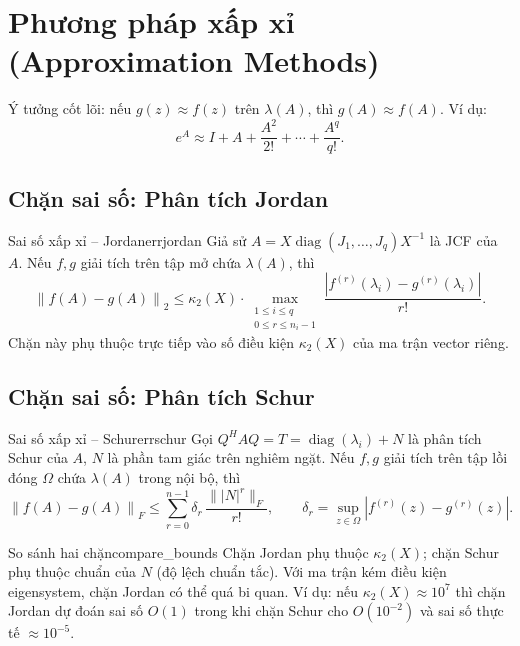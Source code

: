 \documentclass[12pt,a4paper]{report}
\newcommand{\norm}[1]{\left\lVert #1 \right\rVert}
\newcommand{\abs}[1]{\left\lvert #1 \right\rvert}
\newcommand{\diag}{\operatorname{diag}}
\begin{document}
\section{Phương pháp xấp xỉ (Approximation Methods)}
\label{sec:approx}

Ý tưởng cốt lõi: nếu $g(z) \approx f(z)$ trên $\lambda(A)$, thì $g(A) \approx f(A)$.
Ví dụ:
\[
  e^A \approx I + A + \frac{A^2}{2!} + \cdots + \frac{A^q}{q!}.
\]

\subsection{Chặn sai số: Phân tích Jordan}

\begin{theorem}{Sai số xấp xỉ -- Jordan}{errjordan}
Giả sử $A = X \diag(J_1,\ldots,J_q) X^{-1}$ là JCF của $A$. Nếu $f,g$ giải tích
trên tập mở chứa $\lambda(A)$, thì
\[
  \norm{f(A) - g(A)}_2
  \le \kappa_2(X) \cdot \max_{\substack{1 \le i \le q \\ 0 \le r \le n_i-1}}
      \frac{\abs{f^{(r)}(\lambda_i) - g^{(r)}(\lambda_i)}}{r!}.
\]
Chặn này phụ thuộc trực tiếp vào số điều kiện $\kappa_2(X)$ của ma trận vector riêng.
\end{theorem}

\subsection{Chặn sai số: Phân tích Schur}

\begin{theorem}{Sai số xấp xỉ -- Schur}{errschur}
Gọi $Q^H AQ = T = \diag(\lambda_i) + N$ là phân tích Schur của $A$, $N$ là phần
tam giác trên nghiêm ngặt. Nếu $f,g$ giải tích trên tập lồi đóng $\Omega$ chứa
$\lambda(A)$ trong nội bộ, thì
\[
  \norm{f(A) - g(A)}_F
  \le \sum_{r=0}^{n-1} \delta_r \,
      \frac{\bigl\| |N|^r \bigr\|_F}{r!},
  \qquad
  \delta_r = \sup_{z \in \Omega} \abs{f^{(r)}(z) - g^{(r)}(z)}.
\]
\end{theorem}

\begin{remark}{So sánh hai chặn}{compare_bounds}
Chặn Jordan phụ thuộc $\kappa_2(X)$; chặn Schur phụ thuộc chuẩn của $N$ (độ lệch
chuẩn tắc). Với ma trận kém điều kiện eigensystem, chặn Jordan có thể quá bi quan.
Ví dụ: nếu $\kappa_2(X) \approx 10^7$ thì chặn Jordan dự đoán sai số $O(1)$ trong
khi chặn Schur cho $O(10^{-2})$ và sai số thực tế $\approx 10^{-5}$.
\end{remark}
\end{document}
